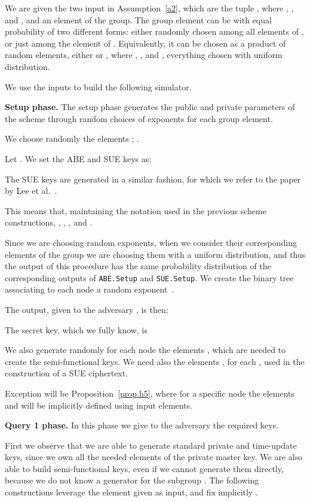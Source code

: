 \documentclass[a4paper,10pt]{article}
\newcommand{\algorithm}[2]{\texttt{#1.#2}}
\newcommand{\randomchoose}[1]{We choose randomly the element\ifstrequal{#1}{s}{}{s} }
\newcommand{\phase}[1]{\textbf{#1 phase.} \hspace{0pt}}
\newcommand{\disclaimerSUE}{The SUE keys are generated in a similar fashion, for which we refer to the paper by Lee et al.~\cite{lee2013RSABE}.

}
\begin{document}
		We are given the two input in Assumption~\ref{a2}, which are the tuple \linebreak, where , , and , and an element  of the group.
		The group element  can be with equal probability of two different forms: either randomly chosen among all elements of , or just among the element of . Equivalently, it can be chosen as a product of random elements, either  or , where , , and , everything chosen with uniform distribution.
		
	We use the inputs to build the following simulator.
	
	\phase{Setup}
	The setup phase generates the public and private parameters of the scheme through random choices of exponents for each group element.
	
	\randomchoose{p}{;
		.
	}
	
	Let . We set the ABE and SUE keys as:
	
	\disclaimerSUE{}
		This means that, maintaining the notation used in the previous scheme constructions, , , , and .
	
	Since we are choosing random exponents, when we consider their corresponding elements of the group we are choosing them with a uniform distribution, and thus the output of this procedure has the same probability distribution of the corresponding outputs of \algorithm{ABE}{Setup} and \algorithm{SUE}{Setup}.
	We create the binary tree  associating to each node  a random exponent~.
	
	The output, given to the adversary , is then:
	
	
	The secret key, which we fully know, is 
	
	We also generate randomly for each node  the elements , which are needed to create the semi-functional keys. We need also the elements , for each , used in the construction of a SUE ciphertext.
	
	Exception will be Proposition~\ref{prop.h5}, where for a specific node  the elements  and  will be implicitly defined using input elements.
	
	\phase{Query 1}
	In this phase we give to the adversary  the required keys.
	
	First we observe that we are able to generate standard private and time-update keys, since we own all the needed elements of the private master key. We are also able to build semi-functional keys, even if we cannot generate them directly, because we do not know a generator for the subgroup . The following con\-struc\-tions leverage the element  given as input, and fix implicitly . 
	
\end{document}
